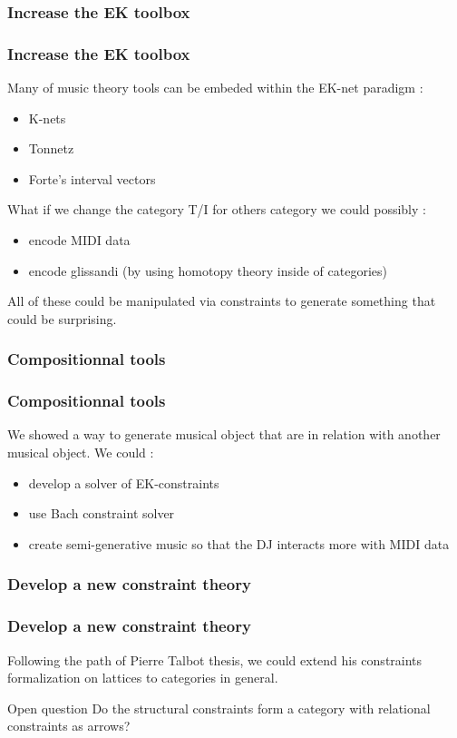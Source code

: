 \documentclass{beamer}
\begin{document}
\subsubsection{Increase the EK toolbox}
\begin{frame}
	\frametitle{Increase the EK toolbox}
	Many of music theory tools can be embeded within the EK-net paradigm :
	\begin{itemize}
		\item K-nets
		\item Tonnetz
		\item Forte's interval vectors
	\end{itemize}
	\pause
	What if we change the category T/I for others category we could possibly :
	\begin{itemize}
		\item encode MIDI data
		\item encode glissandi (by using homotopy theory inside of categories)
	\end{itemize}

	All of these could be manipulated via constraints to generate something that could be surprising.
\end{frame}



\subsubsection{Compositionnal tools}
\begin{frame}
	\frametitle{Compositionnal tools}
	We showed a way to generate musical object that are in relation with another musical object.  We could :
	\begin{itemize}
		\item develop a solver of EK-constraints
		\item use Bach constraint solver
		\item create semi-generative music so that the DJ interacts more with MIDI data
	\end{itemize}
\end{frame}

\subsubsection{Develop a new constraint theory}
\begin{frame}
	\frametitle{Develop a new constraint theory}
	Following the path of Pierre Talbot thesis, we could extend his constraints formalization on lattices to categories in general.

	\begin{exampleblock}{Open question}
		Do the structural constraints form a category with relational constraints as arrows?
	\end{exampleblock}
\end{frame}
\end{document}
